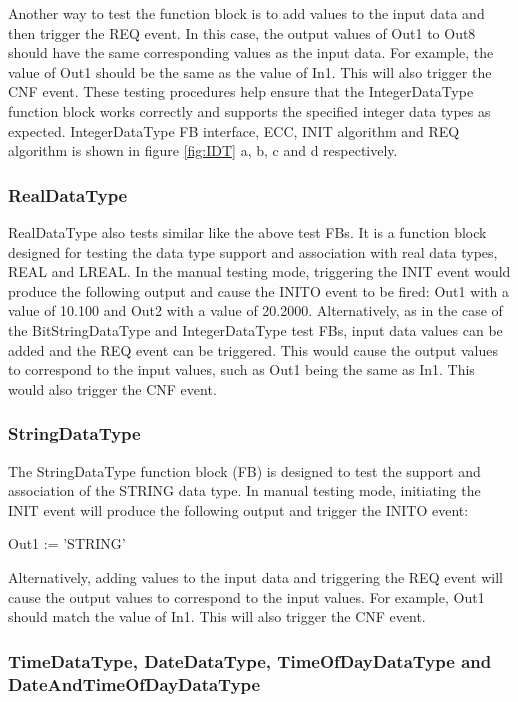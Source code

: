 \begin{bibunit}
Another way to test the function block is to add values to the input data and then trigger the REQ event. In this case, the output values of Out1 to Out8 should have the same corresponding values as the input data. For example, the value of Out1 should be the same as the value of In1. This will also trigger the CNF event. These testing procedures help ensure that the IntegerDataType function block works correctly and supports the specified integer data types as expected. IntegerDataType FB interface, ECC, INIT algorithm and REQ algorithm  is shown in figure \ref{fig:IDT} a, b, c and d respectively.
\hfill \break
\subsubsection{RealDataType}

RealDataType also tests similar like the above test FBs.
It is a function block designed for testing the data type support and association with real data types, REAL and LREAL. In the manual testing mode, triggering the INIT event would produce the following output and cause the INITO event to be fired: Out1 with a value of 10.100 and Out2 with a value of 20.2000. Alternatively, as in the case of the BitStringDataType and IntegerDataType test FBs, input data values can be added and the REQ event can be triggered. This would cause the output values to correspond to the input values, such as Out1 being the same as In1. This would also trigger the CNF event.

\subsubsection{StringDataType}

The StringDataType function block (FB) is designed to test the support and association of the STRING data type. In manual testing mode, initiating the INIT event will produce the following output and trigger the INITO event:

Out1 := 'STRING'

Alternatively, adding values to the input data and triggering the REQ event will cause the output values to correspond to the input values. For example, Out1 should match the value of In1. This will also trigger the CNF event.
\break
\subsubsection{TimeDataType, DateDataType, TimeOfDayDataType and DateAndTimeOfDayDataType}


\end{bibunit}
